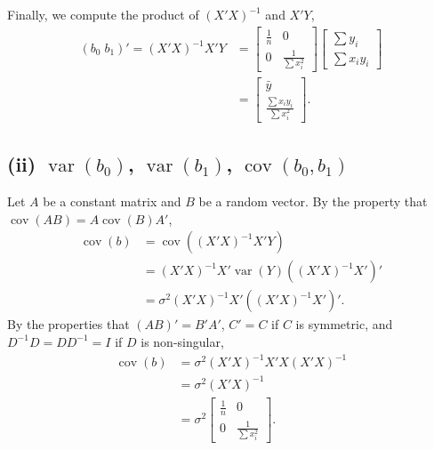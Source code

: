 \documentclass[
]{article}
\begin{document}
Finally, we compute the product of \((X'X)^{-1}\) and \(X'Y\),
\begin{align*}
  (b_0\;b_1)' = (X'X)^{-1} X'Y
  &=
  \begin{bmatrix}
    \frac{1}{n} & 0\\
    0           & \frac{1}{\sum x_i^2}
  \end{bmatrix}
  \begin{bmatrix}
    \sum y_i\\
    \sum x_i y_i
  \end{bmatrix}\\
  &=
  \begin{bmatrix}
    \bar{y}\\
    \frac{\sum x_i y_i}{\sum x_i^2}
  \end{bmatrix}.
\end{align*}

\hypertarget{ii-operatornamevarb_0-operatornamevarb_1-operatornamecovb_0b_1}{%
\subsection{\texorpdfstring{(ii) \(\operatorname{var}(b_0)\),
\(\operatorname{var}(b_1)\),
\(\operatorname{cov}(b_0,b_1)\)}{(ii) \textbackslash operatorname\{var\}(b\_0), \textbackslash operatorname\{var\}(b\_1), \textbackslash operatorname\{cov\}(b\_0,b\_1)}}\label{ii-operatornamevarb_0-operatornamevarb_1-operatornamecovb_0b_1}}

Let \(A\) be a constant matrix and \(B\) be a random vector. By the
property that \(\operatorname{cov}(A B) = A \operatorname{cov}(B) A'\),
\begin{align*}
  \operatorname{cov}(b) &= \operatorname{cov}((X'X)^{-1} X' Y)\\
          &= (X'X)^{-1} X' \operatorname{var}(Y) ((X'X)^{-1} X')'\\
          &= \sigma^2 (X'X)^{-1} X'((X'X)^{-1} X')'.
\end{align*} By the properties that \((A B)' = B'A'\), \(C' = C\) if
\(C\) is symmetric, and \(D^{-1} D = D D^{-1} = I\) if \(D\) is
non-singular, \begin{align*}
  \operatorname{cov}(b) &= \sigma^2 (X'X)^{-1} X'X (X'X)^{-1}\\
          &= \sigma^2 (X'X)^{-1}\\
          &= \sigma^2
            \begin{bmatrix}
              \frac{1}{n} & 0\\
              0           & \frac{1}{\sum x_i^2}
            \end{bmatrix}.
\end{align*}
\end{document}
